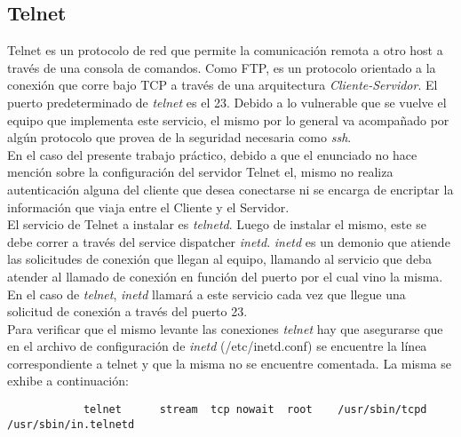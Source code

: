	\subsection{Telnet}
		\indent Telnet es un protocolo de red que permite la comunicación remota a otro host a través de una consola de comandos. Como FTP, es un
		protocolo orientado a la conexión que corre bajo TCP a través de una arquitectura \textit{Cliente-Servidor}. El puerto predeterminado de 
		\textit{telnet} es el 23. Debido a lo vulnerable que se vuelve el equipo que implementa este servicio, el mismo por lo general va acompañado
		por algún protocolo que provea de la seguridad necesaria como \textit{ssh}. \\
		\indent En el caso del presente trabajo práctico, debido a que el enunciado no hace mención sobre la configuración del servidor Telnet el, mismo no 
		realiza autenticación alguna del cliente que desea conectarse ni se encarga de encriptar la información que viaja entre el Cliente y el Servidor. \\
		\indent El servicio de Telnet a instalar es \textit{telnetd}. Luego de instalar el mismo, este se debe correr a través del service dispatcher
		\textit{inetd}. \textit{inetd} es un demonio que atiende las solicitudes de conexión que llegan al equipo, llamando al servicio que deba atender
		al llamado de conexión en función del puerto por el cual vino la misma. En el caso de \textit{telnet}, \textit{inetd} llamará a este servicio cada
		vez que llegue una solicitud de conexión a través del puerto 23. \\
		\indent Para verificar que el mismo levante las conexiones \textit{telnet} hay que asegurarse
		que en el archivo de configuración de \textit{inetd} (/etc/inetd.conf)  se encuentre la línea correspondiente a telnet y que la misma no se 
		encuentre comentada. La misma se exhibe a continuación: \\
		\begin{verbatim}
			telnet		stream	tcp	nowait	root	/usr/sbin/tcpd	/usr/sbin/in.telnetd
		\end{verbatim} 

